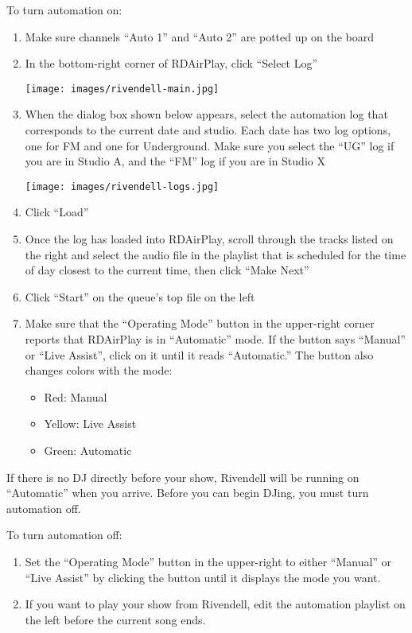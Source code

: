 \documentclass{witrman}
\begin{document}
To turn automation on:
\begin{enumerate}
    \item Make sure channels ``Auto 1'' and ``Auto 2'' are potted up on the
        board
    \item In the bottom-right corner of RDAirPlay, click ``Select Log''

        \texttt{[image: images/rivendell-main.jpg]}

    \item When the dialog box shown below appears, select the automation log
        that corresponds to the current date and studio.  Each date has two log
        options, one for FM and one for Underground.  Make sure you select the
        ``UG'' log if you are in Studio A, and the ``FM'' log if you are in
        Studio X

        \texttt{[image: images/rivendell-logs.jpg]}

    \item Click ``Load''
    \item Once the log has loaded into RDAirPlay, scroll through the tracks
        listed on the right and select the audio file in the playlist that is
        scheduled for the time of day closest to the current time, then click
        ``Make Next''
    \item Click ``Start'' on the queue's top file on the left
    \item Make sure that the ``Operating Mode'' button in the upper-right corner
        reports that RDAirPlay is in ``Automatic'' mode.  If the button says
        ``Manual'' or ``Live Assist'', click on it until it reads ``Automatic.''
        The button also changes colors with the mode:
        \begin{itemize}
            \item Red: Manual
            \item Yellow: Live Assist
            \item Green: Automatic
        \end{itemize}
\end{enumerate}

If there is no DJ directly before your show, Rivendell will be running on
``Automatic'' when you arrive.  Before you can begin DJing, you must turn
automation off.

To turn automation off:
\begin{enumerate}
    \item Set the ``Operating Mode'' button in the upper-right to either
        ``Manual'' or ``Live Assist'' by clicking the button until it displays
        the mode you want.
    \item If you want to play your show from Rivendell, edit the automation
        playlist on the left before the current song ends.
\end{enumerate}
\end{document}
